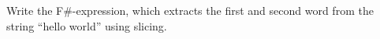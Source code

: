Write the F\#-expression, which extracts the first and second word from the string ``hello world'' using slicing.
